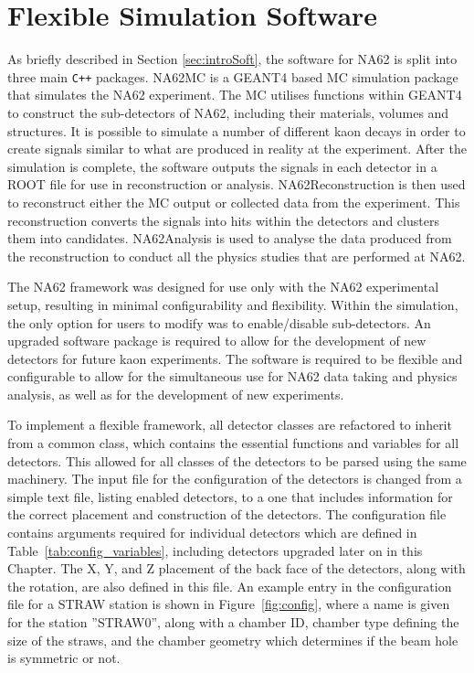 \documentclass[../../main.tex]{subfiles}
\begin{document}
    \section{Flexible Simulation Software}\label{sec:na62fw}
    As briefly described in Section \ref{sec:introSoft}, the software for NA62 is split into three main \sloppy\texttt{C++} packages. 
    NA62MC is a GEANT4 based \gls{MC} simulation package that simulates the NA62 experiment. The \gls{MC} utilises functions within GEANT4 to construct the sub-detectors of NA62, including their materials, volumes and structures. It is possible to simulate a number of different kaon decays in order to create signals similar to what are produced in reality at the experiment. After the simulation is complete, the software outputs the signals in each detector in a ROOT file for use in reconstruction or analysis. 
    NA62Reconstruction is then used to reconstruct either the \gls{MC} output or collected data from the experiment. This reconstruction converts the signals into hits within the detectors and clusters them into candidates. NA62Analysis is used to analyse the data produced from the reconstruction to conduct all the physics studies that are performed at NA62. 

    The NA62 framework was designed for use only with the NA62 experimental setup, resulting in minimal configurability and flexibility. Within the simulation, the only option for users to modify was to enable/disable sub-detectors. An upgraded software package is required to allow for the development of new detectors for future kaon experiments. 
    The software is required to be flexible and configurable to allow for the simultaneous use for NA62 data taking and physics analysis, as well as for the development of new experiments.
    
    To implement a flexible framework, all detector classes are refactored to inherit from a common class, which contains the essential functions and variables for all detectors. This allowed for all classes of the detectors to be parsed using the same machinery. The input file for the configuration of the detectors is changed from a simple text file, listing enabled detectors, to a one that includes information for the correct placement and construction of the detectors. The configuration file contains arguments required for individual detectors which are defined in Table~\ref{tab:config_variables}, including detectors upgraded later on in this Chapter. The X, Y, and Z placement of the back face of the detectors, along with the rotation, are also defined in this file. 
    An example entry in the configuration file for a STRAW station is shown in Figure~\ref{fig:config}, where a name is given for the station ''STRAW0'', along with a chamber ID, chamber type defining the size of the straws, and the chamber geometry which determines if the beam hole is symmetric or not.  
\end{document}
